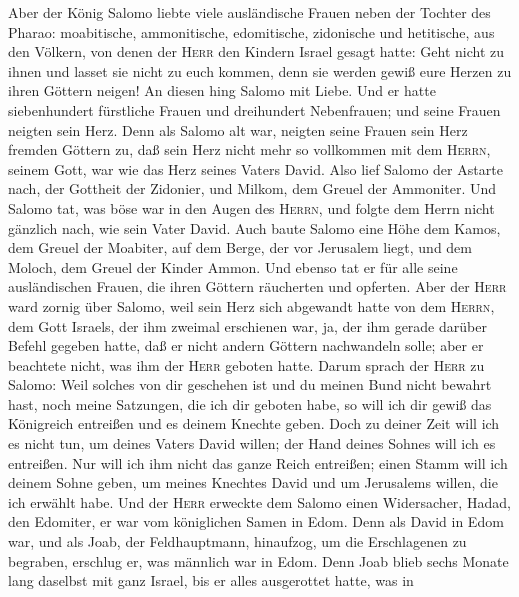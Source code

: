  Aber der König Salomo liebte viele ausländische Frauen
neben der Tochter des Pharao: moabitische, ammonitische, edomitische,
zidonische und hetitische,  aus den Völkern, von denen der
\textsc{Herr} den Kindern Israel gesagt hatte: Geht nicht zu ihnen und
lasset sie nicht zu euch kommen, denn sie werden gewiß eure Herzen zu
ihren Göttern neigen! An diesen hing Salomo mit Liebe. 
Und er hatte siebenhundert fürstliche Frauen und dreihundert
Nebenfrauen; und seine Frauen neigten sein Herz.  Denn als
Salomo alt war, neigten seine Frauen sein Herz fremden Göttern zu, daß
sein Herz nicht mehr so vollkommen mit dem \textsc{Herrn}, seinem Gott,
war wie das Herz seines Vaters David.  Also lief Salomo
der Astarte nach, der Gottheit der Zidonier, und Milkom, dem Greuel der
Ammoniter.  Und Salomo tat, was böse war in den Augen des
\textsc{Herrn}, und folgte dem Herrn nicht gänzlich nach, wie sein Vater
David.  Auch baute Salomo eine Höhe dem Kamos, dem Greuel
der Moabiter, auf dem Berge, der vor Jerusalem liegt, und dem Moloch,
dem Greuel der Kinder Ammon.  Und ebenso tat er für alle
seine ausländischen Frauen, die ihren Göttern räucherten und opferten.
 Aber der \textsc{Herr} ward zornig über Salomo, weil sein
Herz sich abgewandt hatte von dem \textsc{Herrn}, dem Gott Israels, der
ihm zweimal erschienen war,  ja, der ihm gerade darüber
Befehl gegeben hatte, daß er nicht andern Göttern nachwandeln solle;
aber er beachtete nicht, was ihm der \textsc{Herr} geboten hatte.
 Darum sprach der \textsc{Herr} zu Salomo: Weil solches
von dir geschehen ist und du meinen Bund nicht bewahrt hast, noch meine
Satzungen, die ich dir geboten habe, so will ich dir gewiß das
Königreich entreißen und es deinem Knechte geben.  Doch
zu deiner Zeit will ich es nicht tun, um deines Vaters David willen; der
Hand deines Sohnes will ich es entreißen.  Nur will ich
ihm nicht das ganze Reich entreißen; einen Stamm will ich deinem Sohne
geben, um meines Knechtes David und um Jerusalems willen, die ich
erwählt habe.  Und der \textsc{Herr} erweckte dem Salomo
einen Widersacher, Hadad, den Edomiter, er war vom königlichen Samen in
Edom.  Denn als David in Edom war, und als Joab, der
Feldhauptmann, hinaufzog, um die Erschlagenen zu begraben, erschlug er,
was männlich war in Edom.  Denn Joab blieb sechs Monate
lang daselbst mit ganz Israel, bis er alles ausgerottet hatte, was in

